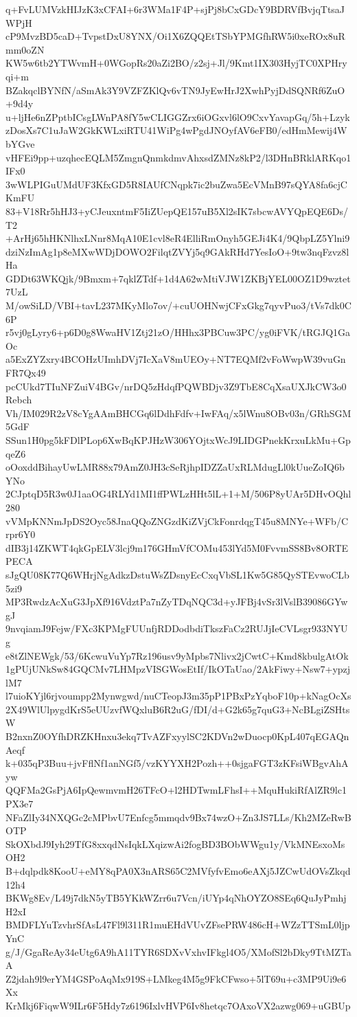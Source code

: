 q+FvLUMVzkHIJzK3xCFAI+6r3WMa1F4P+sjPj8bCxGDcY9BDRVfBvjqTtsaJWPjH
cP9MvzBD5caD+TvpstDxU8YNX/Oi1X6ZQQEtTSbYPMGfhRW5i0xeROx8uRmm0oZN
KW5w6tb2YTWvmH+0WGopRs20aZi2BO/z2sj+Jl/9Kmt1IX303HyjTC0XPHryqi+m
BZakqclBYNfN/aSmAk3Y9VZFZKlQv6vTN9JyEwHrJ2XwhPyjDdSQNRf6ZuO+9d4y
u+ljHe6nZPptbICsgLWnPA8fY5wCLIGGZrx6iOGxvl6lO9CxvYavapGq/5h+Lzyk
zDosXs7C1uJaW2GkKWLxiRTU41WiPg4wPgdJNOyfAV6eFB0/edHmMewij4WbYGve
vHFEi9pp+uzqhecEQLM5ZmgnQnmkdmvAhxsdZMNz8kP2/l3DHnBRklARKqo1IFx0
3wWLPIGuUMdUF3KfxGD5R8IAUfCNqpk7ic2buZwa5EcVMnB97sQYA8fa6cjCKmFU
83+V18Rr5hHJ3+yCJeuxntmF5IiZUepQE157uB5Xl2sIK7sbcwAVYQpEQE6Ds/T2
+ArHj65hHKNlhxLNnr8MqA10E1cvl8eR4ElliRmOnyh5GEJi4K4/9QbpLZ5Ylni9
dziNzImAg1p8eMXwWDjDOWO2FilqtZVYj5q9GAkRHd7YesIoO+9tw3nqFzvz8lHa
GDDt63WKQjk/9Bmxm+7qklZTdf+1d4A62wMtiVJW1ZKBjYEL00OZ1D9wztet7UzL
M/owSiLD/VBI+tavL237MKyMlo7ov/+cuUOHNwjCFxGkg7qyvPuo3/tVs7dk0C6P
r5vj0gLyry6+p6D0g8WwaHV1Ztj21zO/HHhx3PBCuw3PC/yg0iFVK/tRGJQ1GaOc
a5ExZYZxry4BCOHzUImhDVj7IcXaV8mUEOy+NT7EQMf2vFoWwpW39vuGnFR7Qx49
pcCUkd7TIuNFZuiV4BGv/nrDQ5zHdqfPQWBDjv3Z9TbE8CqXsaUXJkCW3o0Rebch
Vh/IM029R2zV8cYgAAmBHCGq6lDdhFdfv+IwFAq/x5lWnu8OBv03n/GRhSGM5GdF
SSun1H0pg5kFDlPLop6XwBqKPJHzW306YOjtxWcJ9LIDGPnekKrxuLkMu+GpqeZ6
oOoxddBihayUwLMR88x79AmZ0JH3cSeRjhpIDZZaUxRLMdugLl0kUueZoIQ6bYNo
2CJptqD5R3w0J1aaOG4RLYd1MI1ffPWLzHHt5lL+1+M/506P8yUAr5DHvOQhl280
vVMpKNNmJpDS2Oyc58JnaQQoZNGzdKiZVjCkFonrdqgT45u8MNYe+WFb/Crpr6Y0
dIB3j14ZKWT4qkGpELV3lcj9m176GHmVfCOMu453lYd5M0FvvmSS8Bv8ORTEPECA
sJgQU08K77Q6WHrjNgAdkzDstuWsZDsnyEcCxqVbSL1Kw5G85QySTEvwoCLb5zi9
MP3RwdzAcXuG3JpXf916VdztPa7nZyTDqNQC3d+yJFBj4vSr3lVslB39086GYwgJ
9nvqiamJ9Fejw/FXc3KPMgFUUnfjRDDodbdiTkszFaCz2RUJjIeCVLsgr933NYUg
e8tZlNEWgk/53/6KcwuVuYp7Rz196usv9yMpbs7Nlivx2jCwtC+Kmd8kbulgAtOk
1gPUjUNkSw84GQCMv7LHMpzVISGWosEtIf/IkOTaUao/2AkFiwy+Nsw7+ypzjlM7
l7uioKYjl6rjvoumpp2Mynwgwd/nuCTeopJ3m35pP1PBxPzYqboF10p+kNagOcXs
2X49WlUlpygdKrS5eUUzvfWQxluB6R2uG/fDI/d+G2k65g7quG3+NcBLgiZSHtsW
B2nxnZ0OYfhDRZKHnxu3ekq7TvAZFxyylSC2KDVn2wDuocp0KpL407qEGAQnAeqf
k+035qP3Buu+jvFflNf1anNGf5/vzKYYXH2Pozh++0sjgaFGT3zKFsiWBgvAhAyw
QQFMa2GsPjA6IpQewmvmH26TFcO+l2HDTwmLFhsI++MquHukiRfAlZR9lc1PX3e7
NFaZlIy34NXQGc2cMPbvU7Enfcg5mmqdv9Bx74wzO+Zn3JS7LLs/Kh2MZeRwBOTP
SkOXbdJ9Iyh29TfG8xxqdNsIqkLXqizwAi2fogBD3BObWWgu1y/VkMNEsxoMsOH2
B+dqlpdk8KooU+eMY8qPA0X3nARS65C2MVfyfvEmo6eAXj5JZCwUdOVsZkqd12h4
BKWg8Ev/L49j7dkN5yTB5YKkWZrr6u7Vcn/iUYp4qNhOYZO8SEq6QuJyPmhjH2xI
BMDFLYuTzvhrSfAsL47Fl9l311R1muEHdVUvZFsePRW486cH+WZzTTSmL0ljpYnC
g/J/GgaReAy34eUtg6A9hA11TYR6SDXvVxhvIFkgl4O5/XMofSl2bDky9TtMZTaA
Z2jdah9l9erYM4GSPoAqMx919S+LMkeg4M5g9FkCFwso+5lT69u+c3MP9Ui9e6Xx
KrMkj6FiqwW9ILr6F5Hdy7z6196IxlvHVP6Iv8hetqc7OAxoVX2azwg069+uGBUp
